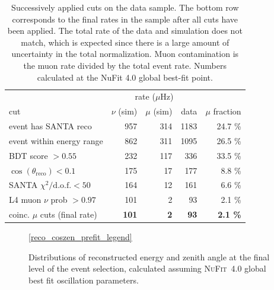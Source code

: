 \begin{table}
\caption{Successively applied cuts on the data sample. The bottom row corresponds to the final rates in the sample after all cuts have been applied. The total rate of the data and simulation does not match, which is expected since there is a large amount of uncertainty in the total normalization. Muon contamination is the muon rate divided by the total event rate. Numbers calculated at the NuFit 4.0 global best-fit point.}
\centering
\begin{tabular}{@{}lrrrr@{}}\toprule
& \multicolumn{3}{c}{rate ($\mu$Hz)} & \\ \cmidrule{2-4}
cut                                 & {$\nu$ (sim)} & {$\mu$ (sim)} & {data} & {$\mu$ fraction} \\ \midrule
event has SANTA reco                   & 957  & 314  & 1183 & 24.7 \%  \\
event within energy range              & 862  & 311  & 1095 & 26.5 \%  \\
BDT score $>0.55$                      & 232  & 117  &  336 & 33.5 \%  \\
$\cos(\theta_{\mathrm{reco}}) < 0.1$   & 175  &  17  &  177 & 8.8 \%   \\
SANTA $\chi^2/\mathrm{d.o.f.} < 50$    & 164  &  12  &  161 & 6.6 \%   \\
L4 muon $\nu$ prob $> 0.97$            & 101  &   2  &   93 & 2.1 \% \\
\midrule\addlinespace
coinc. $\mu$ cuts (final rate) & \textbf{101} & \textbf{2} & \textbf{93} & \textbf{2.1 \%} \\ \bottomrule
\end{tabular}
\label{tab:muon-rejection-cut-rates}
\end{table}

\begin{figure}
    \centering
    \ref{reco_coszen_prefit_legend}\par
    
    
    \caption{Distributions of reconstructed energy and zenith angle at the final level of the event selection, calculated assuming \textsc{NuFit}~4.0\cite{nufit40} global best fit oscillation parameters.}
    \label{fig:pre-fit-energy-coszen}
\end{figure}


